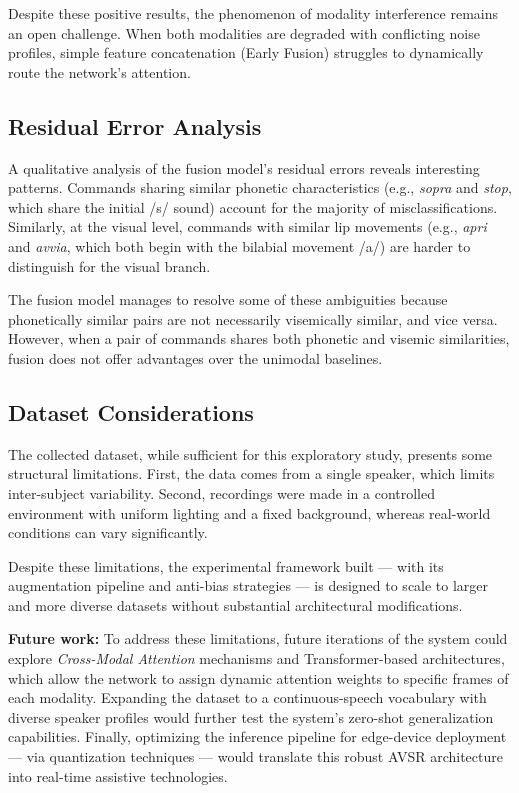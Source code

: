 \documentclass[sigconf,screen,nonacm]{acmart}
\begin{document}
Despite these positive results, the phenomenon of modality interference remains an open challenge. When both modalities are degraded with conflicting noise profiles, simple feature concatenation (Early Fusion) struggles to dynamically route the network's attention.

\subsection{Residual Error Analysis}

A qualitative analysis of the fusion model's residual errors reveals interesting patterns. Commands sharing similar phonetic characteristics (e.g., \textit{sopra} and \textit{stop}, which share the initial /s/ sound) account for the majority of misclassifications. Similarly, at the visual level, commands with similar lip movements (e.g., \textit{apri} and \textit{avvia}, which both begin with the bilabial movement /a/) are harder to distinguish for the visual branch.

The fusion model manages to resolve some of these ambiguities because phonetically similar pairs are not necessarily visemically similar, and vice versa. However, when a pair of commands shares both phonetic and visemic similarities, fusion does not offer advantages over the unimodal baselines.

\subsection{Dataset Considerations}

The collected dataset, while sufficient for this exploratory study, presents some structural limitations. First, the data comes from a single speaker, which limits inter-subject variability. Second, recordings were made in a controlled environment with uniform lighting and a fixed background, whereas real-world conditions can vary significantly.

Despite these limitations, the experimental framework built --- with its augmentation pipeline and anti-bias strategies --- is designed to scale to larger and more diverse datasets without substantial architectural modifications.

\textbf{Future work:} To address these limitations, future iterations of the system could explore \textit{Cross-Modal Attention} mechanisms and Transformer-based architectures, which allow the network to assign dynamic attention weights to specific frames of each modality. Expanding the dataset to a continuous-speech vocabulary with diverse speaker profiles would further test the system's zero-shot generalization capabilities. Finally, optimizing the inference pipeline for edge-device deployment --- via quantization techniques --- would translate this robust AVSR architecture into real-time assistive technologies.



\end{document}
